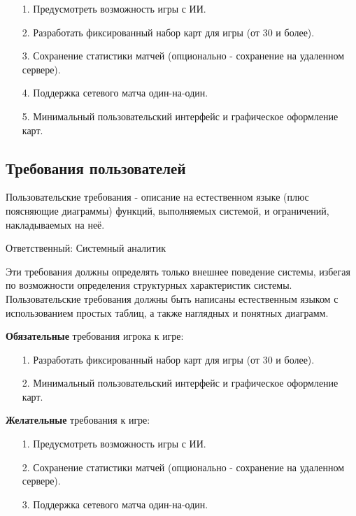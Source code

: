 \documentclass[12pt, a4paper, simple]{eskdtext}
\begin{document}
    \begin{enumerate}
        \item[1.] Предусмотреть возможность игры с ИИ.
        \item[2.] Разработать фиксированный набор карт для игры (от 30 и более).
        \item[3.] Сохранение статистики матчей (опционально - сохранение на удаленном сервере).
        \item[4.] Поддержка сетевого матча один-на-один.
        \item[5.] Минимальный пользовательский интерфейс и графическое оформление карт.
    \end{enumerate}
    
    \subsection{Требования пользователей}

    Пользовательские требования - описание на естественном языке (плюс поясняющие диаграммы) функций, выполняемых системой, и ограничений, накладываемых на неё.

    Ответственный: Системный аналитик

    Эти требования должны определять только внешнее поведение системы, избегая по возможности определения структурных характеристик системы.
    Пользовательские требования должны быть написаны естественным языком с использованием простых таблиц, а также наглядных и понятных диаграмм.

    \textbf{Обязательные} требования игрока к игре:

    \begin{enumerate}
        \item [1.] Разработать фиксированный набор карт для игры (от 30 и более).
        \item [2.] Минимальный пользовательский интерфейс и графическое оформление карт.
    \end{enumerate}

    \textbf{Желательные} требования к игре:

    \begin{enumerate}
        \item [1.] Предусмотреть возможность игры с ИИ.
        \item [2.] Сохранение статистики матчей (опционально - сохранение на удаленном сервере).
        \item [3.] Поддержка сетевого матча один-на-один.
    \end{enumerate}
\end{document}

